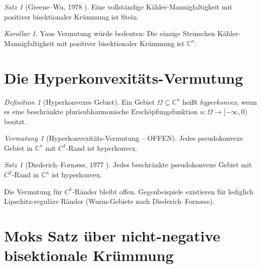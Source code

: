 \documentclass[12pt,a4paper]{amsart}
\theoremstyle{definition}
\theoremstyle{remark}
\newtheorem{satz}[theorem]{Satz}
\newtheorem{korollar}[theorem]{Korollar}
\newtheorem{vermutung}[theorem]{Vermutung}
\newtheorem{definition_de}[theorem]{Definition}
\newcommand{\CC}{\mathbb{C}}
\begin{document}
\begin{satz}[Greene--Wu, 1978 \cite{GreeneWu1978}]
Eine vollständige Kähler-Mannigfaltigkeit mit positiver bisektionaler
Krümmung ist Stein.
\end{satz}

\begin{korollar}
Yaus Vermutung würde bedeuten: Die einzige Steinschen Kähler-Mannigfaltigkeit
mit positiver bisektionaler Krümmung ist $\CC^n$.
\end{korollar}

\section{Die Hyperkonvexitäts-Vermutung}

\begin{definition_de}[Hyperkonvexes Gebiet]
Ein Gebiet $\Omega \subseteq \CC^n$ heißt \emph{hyperkonvex}, wenn es eine
beschränkte plurisubharmonische Erschöpfungsfunktion
$u \colon \Omega \to [-\infty, 0)$ besitzt.
\end{definition_de}

\begin{vermutung}[Hyperkonvexitäts-Vermutung -- OFFEN]
\label{verm:hyperkonvex}
Jedes pseudokonvexe Gebiet in $\CC^n$ mit $C^1$-Rand ist hyperkonvex.
\end{vermutung}

\begin{satz}[Diederich--Fornæss, 1977 \cite{DiederichFornaess1977}]
Jedes beschränkte pseudokonvexe Gebiet mit $C^2$-Rand in $\CC^n$ ist hyperkonvex.
\end{satz}

Die Vermutung für $C^1$-Ränder bleibt offen.
Gegenbeispiele existieren für lediglich Lipschitz-reguläre Ränder
(Wurm-Gebiete nach Diederich--Fornæss).

\section{Moks Satz über nicht-negative bisektionale Krümmung}
\end{document}
